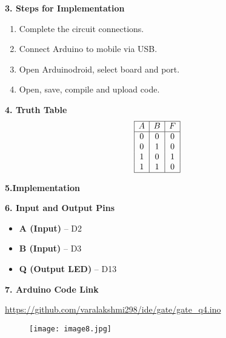 \documentclass[12pt]{article}
\begin{document}
\begin{multicols}{2}
\vspace{1em}
\noindent\textbf{3. Steps for Implementation}
\begin{enumerate}
    \item Complete the circuit connections.
    \item Connect Arduino to mobile via USB.
    \item Open Arduinodroid, select board and port.
    \item Open, save, compile and upload code.
\end{enumerate}

\vspace{1em}
\noindent\textbf{4. Truth Table}
\[
\begin{array}{|c|c|c|c|}
\hline
A & B & F \\
\hline
0 & 0 & 0 \\
0 & 1 & 0 \\
1 & 0 & 1 \\
1 & 1 & 0 \\
\hline
\end{array}
\]

\end{multicols}



\vspace{1em}
\noindent\textbf{5.Implementation}

\noindent
{}


\vspace{1em}
\noindent\textbf{6. Input and Output Pins}
\begin{flushleft}
\begin{itemize}
    \item \textbf{A (Input)} – D2
    \item \textbf{B (Input)} – D3
    \item \textbf{Q (Output LED)} – D13
\end{itemize}

\end{flushleft}

\vspace{1em}
\noindent\textbf{7. Arduino Code Link}

\noindent
\url{https://github.com/varalakshmi298/ide/gate/gate_q4.ino}

\vspace{1em}
\begin{figure}[H]
\texttt{[image: image8.jpg]}
\end{figure}
\end{document}
